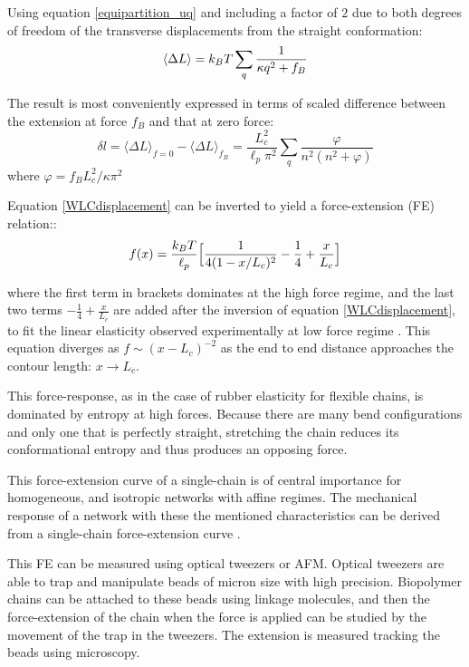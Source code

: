 Using equation \ref{equipartition_uq} and including a factor of $2$ due to both
degrees of freedom of the transverse displacements from the straight
conformation:
\begin{equation}\label{deltaLmean}
\langle\Delta L\rangle = k_B{}T\sum_q \frac{1}{\kappa{}q^2+f_B}
\end{equation}

The result is most conveniently expressed in terms of scaled difference between
the extension at force $f_B$ and that at zero force\citep{storm_nonlinear_2005}:
\begin{equation}\label{WLCdisplacement}
\delta l=\langle\Delta L\rangle_{f=0} - \langle\Delta L\rangle_{f_B} =
\frac{L_c^2}{\ell_p\pi^2} \sum_q \frac{\varphi}{n^2(n^2 + \varphi)}
\end{equation} 
where $\varphi = f_BL_c^2/\kappa{}\pi^2$

Equation \ref{WLCdisplacement} can be inverted to yield a force-extension (FE)
relation:\citep{marko_stretching_1995}:
\begin{equation}\label{FEMarko}
f(x)=\frac{k_B{}T}{\ell_p} \Big[ \frac{1}{4(1 - x/L_c)^2} 
-\frac{1}{4}+\frac{x}{L_c} \Big]
\end{equation}

where the first term in brackets dominates at the
high force regime, and the last two terms $-\frac{1}{4}+\frac{x}{L_c}$ are added
after the inversion of equation \ref{WLCdisplacement}, to fit the linear
elasticity observed experimentally at low force regime
\citep{marko_stretching_1995}.
This equation diverges as $f \sim (x - L_c)^{-2}$ as the end to end
distance approaches the contour length: $x\rightarrow L_c$.

This force-response, as in the case of rubber elasticity  for flexible
chains, is dominated by entropy at high forces. Because there are many
bend configurations and only one that is perfectly straight, stretching the
chain reduces its conformational entropy and thus produces an opposing
force.

This force-extension curve of a single-chain is of central importance for homogeneous,
and isotropic networks with affine regimes. The mechanical response of a network with these the mentioned characteristics can be derived from a single-chain force-extension curve \cite{storm_nonlinear_2005}.

This FE can be measured using optical tweezers or \gls{AFM}.
Optical tweezers are able to trap and manipulate beads of
micron size with high
precision\citep{svoboda_direct_1993,svoboda_biological_1994}.
Biopolymer chains can be attached to these beads using linkage molecules, and then the force-extension of the
chain when the force is applied can be studied by the movement of the trap in
the tweezers.
The extension is measured tracking the beads using microscopy.

